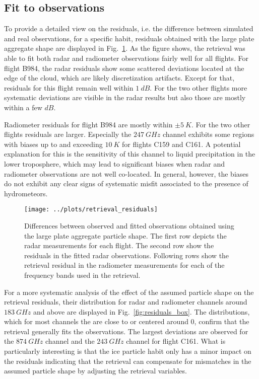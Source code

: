 \documentclass[journal abbreviation, manuscript]{copernicus}
\begin{document}
\subsection{Fit to observations}

To provide a detailed view on the residuals, i.e. the difference between
simulated and real observations, for a specific habit, residuals obtained with
the large plate aggregate shape are displayed in Fig.~\ref{fig:residuals}. As
the figure shows, the retrieval was able to fit both radar and radiometer
observations fairly well for all flights. For flight B984, the radar residuals
show some scattered deviations located at the edge of the cloud, which are
likely discretization artifacts. Except for that, residuals for this flight
remain well within $1\ \unit{dB}$. For the two other flights more systematic
deviations are visible in the radar results but also those are mostly within a
few $\unit{dB}$.

Radiometer residuals for flight B984 are mostly within $\pm 5\ \unit{K}$. For
the two other flights residuals are larger. Especially the $247\ \unit{GHz}$
channel exhibits some regions with biases up to and exceeding $10\ \unit{K}$ for
flights C159 and C161. A potential explanation for this is the sensitivity of
this channel to liquid precipitation in the lower troposphere, which may lead to
significant biases when radar and radiometer observations are not well
co-located. In general, however, the biases do not exhibit any clear signs of
systematic misfit associated to the presence of hydrometeors.

\begin{figure}[!hbpt]
  \centering
  \texttt{[image: ../plots/retrieval\_residuals]}
  \caption{Differences between observed and fitted observations obtained
    using the large plate aggregate particle shape. The first row depicts
    the radar measurements for each flight. The second row show the residuals
    in the fitted radar observations. Following rows show the retrieval residual
    in the radiometer measurements for each of the frequency bands used in
    the retrieval.
    }
  \label{fig:residuals}
\end{figure}

For a more systematic analysis of the effect of the assumed particle shape on
the retrieval residuals, their distribution for radar and radiometer channels
around $183\ \unit{GHz}$ and above are displayed in
Fig.~\ref{fig:residuals_box}. The distributions, which for most channels the are
close to or centered around 0, confirm that the retrieval generally fits the
observations. The largest deviations are observed for the $874\ \unit{GHz}$
channel and the $243\ \unit{GHz}$ channel for flight C161. What is particularly
interesting is that the ice particle habit only has a minor impact on the
residuals indicating that the retrieval can compensate for mismatches in the
assumed particle shape by adjusting the retrieval variables.
\end{document}
